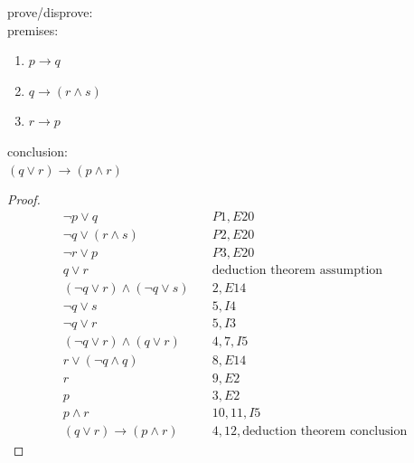\documentclass[a4paper,12pt]{article}
\begin{document}
\begin{question}
prove/disprove:\\[0pt]
premises:\\[0pt]
\begin{enumerate}
\item \(p \to q\)\\[0pt]
\item \(q \to (r \land s)\)\\[0pt]
\item \(r \to p\)\\[0pt]
\end{enumerate}
conclusion:\\[0pt]
\((q \lor r) \to (p \land r)\)\\[0pt]
\begin{proof}
\begin{align}
  \lnot p \lor q &\quad P1,E20\\
  \lnot q \lor (r \land s) &\quad P2,E20\\
  \lnot r \lor p &\quad P3,E20\\
  q \lor r &\quad \text{deduction theorem assumption}\\
  (\lnot q \lor r) \land (\lnot q \lor s) &\quad 2,E14\\
  \lnot q \lor s &\quad 5,I4\\
  \lnot q \lor r &\quad 5,I3\\
  (\lnot q \lor r) \land (q \lor r) &\quad 4,7,I5\\
  r \lor (\lnot q \land q) &\quad 8,E14\\
  r &\quad 9,E2\\
  p &\quad 3,E2\\
  p \land r &\quad 10,11,I5\\
  (q \lor r) \to (p \land r) &\quad 4,12,\text{deduction theorem conclusion}
\end{align}
\end{proof}
\end{question}
\end{document}
